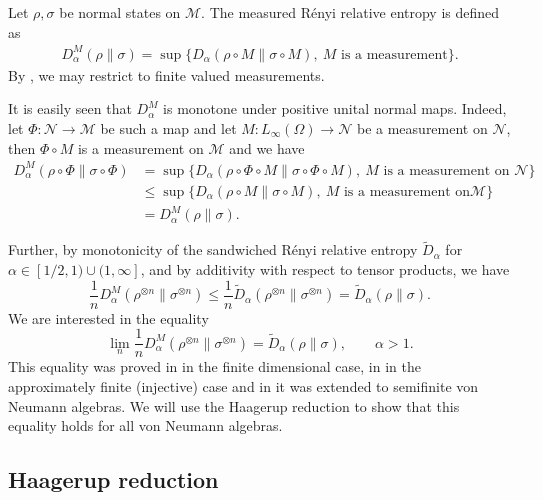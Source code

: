 \documentclass[12pt]{article}
\theoremstyle{definition}
\theoremstyle{remark}
\def\Me{\mathcal M}
\def\Ne{\mathcal N}
\begin{document}
Let $\rho,\sigma$ be normal states on $\Me$. The measured R\'enyi relative entropy is defined as
\begin{align*}
D_\alpha^M(\rho\|\sigma)=\sup\{D_\alpha(\rho\circ M\|\sigma\circ M),\ M \text{ is a
measurement}\}.
\end{align*}
By \cite[Thm. 5.2]{hiai2021quantum}, we may restrict to finite valued measurements. 

It is easily seen that $D_\alpha^M$ is monotone under positive unital normal maps. Indeed, let
$\Phi:\Ne\to \Me$ be such a map and let $M:L_\infty(\Omega)\to \Ne$ be a measurement on
$\Ne$, then $\Phi\circ M$ is a measurement on $\Me$ and we have
\begin{align*}
D^M_\alpha(\rho\circ\Phi\|\sigma\circ\Phi)&=\sup\{D_\alpha(\rho\circ \Phi\circ
M\|\sigma\circ\Phi\circ M),\ M \text{ is a measurement on } \Ne\}\\
&\le
\sup\{D_\alpha(\rho\circ M\|\sigma\circ M),\ M \text{ is a measurement on
}\Me\}\\
&=D^M_\alpha(\rho\|\sigma).
\end{align*}

Further, by monotonicity of the sandwiched R\'enyi relative entropy $\tilde D_\alpha$ for
$\alpha\in [1/2,1)\cup(1,\infty]$, and by
additivity with respect to tensor products, we have
\[
\frac 1n D_\alpha^M(\rho^{\otimes n}\|\sigma^{\otimes n})\le \frac 1n \tilde
D_\alpha(\rho^{\otimes n}\|\sigma^{\otimes n})= \tilde D_\alpha(\rho\|\sigma).
\]
We are interested in the  equality 
\begin{equation}\label{eq:regmeasured}
\lim_n\frac1nD^M_\alpha(\rho^{\otimes n}\|\sigma^{\otimes n})=\tilde D_\alpha(\rho\|\sigma),\qquad \alpha>1.
\end{equation}
This equality was proved in \cite{mosonyi..} in the finite dimensional case,  in 
\cite{Hiai...} in the approximately finite (injective) case and in \cite{fawzi} it was
extended to semifinite von Neumann algebras. We will use the Haagerup reduction to show
that this equality holds for all von Neumann algebras.

\subsection{Haagerup reduction}
\end{document}
